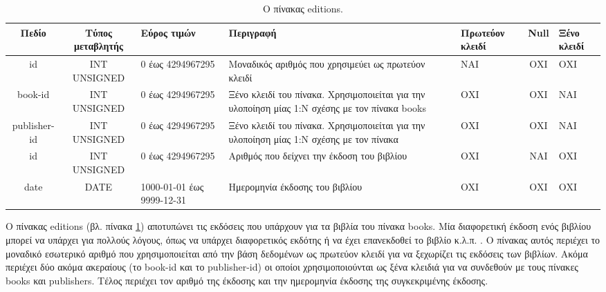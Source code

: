 \documentclass{assignment}
\begin{document}
\begin{landscape}
\begin{table}[htbp]
\begin{center}
  \begin{tabular}{|c|c|m{}|m{}|m{2.0cm}|c|m{1.5cm}|}
    \hline
    {\bf Πεδίο} & {\bf Τύπος μεταβλητής} & {\bf Εύρος τιμών} & {\bf Περιγραφή} & {\bf Πρωτεύον κλειδί} & {\bf Null} & {\bf Ξένο κλειδί} \\ \hline
    id & INT UNSIGNED & 0 έως 4294967295 & Μοναδικός αριθμός που χρησιμεύει ως πρωτεύον κλειδί & ΝΑΙ & ΟΧΙ & ΟΧΙ \\ \hline
    book-id & INT UNSIGNED & 0 έως 4294967295 & Ξένο κλειδί του πίνακα. Χρησιμοποιείται για την υλοποίηση μίας 1:N σχέσης με τον πίνακα books & ΟΧΙ & ΟΧΙ & NAI \\ \hline
    publisher-id & INT UNSIGNED & 0 έως 4294967295 & Ξένο κλειδί του πίνακα. Χρησιμοποιείται για την υλοποίηση μίας 1:N σχέσης με τον πίνακα  & ΟΧΙ & ΟΧΙ & NAI \\ \hline
    id & INT UNSIGNED & 0 έως 4294967295 & Αριθμός που δείχνει την έκδοση του βιβλίου  & ΟΧΙ & ΝΑΙ & ΟΧΙ \\ \hline
    date & DATE & 1000-01-01 έως 9999-12-31 & Ημερομηνία έκδοσης του βιβλίου & OXI & ΟΧΙ & ΟΧΙ \\ \hline
  \end{tabular}
\caption{Ο πίνακας editions.}
\label{table:db_table:editions}
\end{center}
\end{table}

Ο πίνακας editions (βλ. πίνακα \ref{table:db_table:editions}) αποτυπώνει τις εκδόσεις που υπάρχουν για τα βιβλία του πίνακα books. Μία διαφορετική έκδοση ενός βιβλίου μπορεί να υπάρχει για πολλούς λόγους, όπως να υπάρχει διαφορετικός εκδότης ή να έχει επανεκδοθεί το βιβλίο κ.λ.π. . Ο πίνακας αυτός περιέχει το μοναδικό εσωτερικό αριθμό που χρησιμοποιείται από την βάση δεδομένων ως πρωτεύον κλειδί για να ξεχωρίζει τις εκδόσεις των βιβλίων. Ακόμα περιέχει δύο ακόμα ακεραίους (το book-id και το publisher-id) οι οποίοι χρησιμοποιούνται ως ξένα κλειδιά για να συνδεθούν με τους πίνακες books και publishers. Τέλος περιέχει τον αριθμό της έκδοσης και την ημερομηνία έκδοσης της συγκεκριμένης έκδοσης.
\end{landscape}
\end{document}
